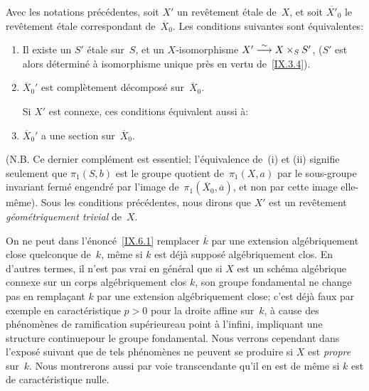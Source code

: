 \begin{corollaire}
\label{IX.6.2}
Avec les notations pr\'ec\'edentes, soit $X'$ un rev\^etement
\'etale de~$X$, et soit $\overline{X'}_0$ le rev\^etement
\'etale correspondant de~$\overline{X}_0$. Les conditions suivantes
sont \'equivalentes:
\begin{enumerate}
\item[(i)] Il existe un $S'$ \'etale sur~$S$, et un $X$-isomorphisme
$X'\overset{\sim}{\longrightarrow} X\times_S S'$, ($S'$ est alors d\'etermin\'e \`a
isomorphisme unique pr\`es en vertu de~\ref{IX.3.4}).
\item[(ii)] $\overline{X}_0'$ est compl\`etement d\'ecompos\'e
sur~$\overline{X}_0$.

Si $X'$ est connexe, ces conditions \'equivalent aussi \`a:
\item[(ii~bis)] $\overline{X}_0'$ a une section sur~$\overline{X}_0$.
\end{enumerate}
\end{corollaire}

(N.B. Ce dernier compl\'ement est essentiel; l'\'equivalence
de~(i) et (ii) signifie seulement que $\pi_1(S,b)$ est le groupe
quotient de~$\pi_1(X,a)$ par le sous-groupe
invariant ferm\'e engendr\'e par l'image
de~$\pi_1(\overline{X}_0,\overline{a})$, et non par cette image
elle-m\^eme). Sous les conditions pr\'ec\'edentes, nous dirons
que $X'$ est un rev\^etement \emph{géométriquement trivial}
de~$X$.

\begin{remarque}
\label{IX.6.3}
On ne peut dans l'\'enonc\'e~\ref{IX.6.1} remplacer $\overline{k}$
par une extension alg\'ebriquement close quelconque de~$k$, m\^eme
si $k$ est d\'ej\`a suppos\'e alg\'ebriquement clos. En
d'autres termes, il n'est pas vrai en g\'en\'eral que si $X$ est
un sch\'ema alg\'ebrique connexe sur un corps alg\'ebriquement
clos $k$, son groupe fondamental ne change pas en rempla\c cant $k$
par une extension alg\'ebriquement close; c'est d\'ej\`a faux
par exemple en caract\'eristique $p>0$ pour la droite affine
sur~$k$, \`a cause des ph\'enom\`enes de \og ramification
sup\'erieure\fg au point \`a l'infini, impliquant une structure
\og continue\fg pour le groupe fondamental. Nous verrons cependant dans
l'expos\'e suivant que de tels ph\'enom\`enes ne peuvent se
produire si $X$ est \emph{propre} sur~$k$. Nous montrerons aussi par
voie transcendante qu'il en est de m\^eme si $k$ est de
caract\'eristique nulle.
\end{remarque}

